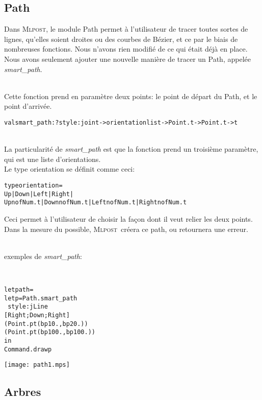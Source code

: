 \documentclass[a4paper,12pt]{article}
\newcommand{\mlpost}{\textsc{Mlpost}}
\begin{document}
\subsection{Path}
Dans \mlpost, le module Path permet à l'utilisateur de tracer toutes sortes de lignes, qu'elles soient droites ou des courbes de Bézier, et ce par le biais de nombreuses fonctions.
Nous n'avons rien modifié de ce qui était déjà en place. Nous avons seulement ajouter une nouvelle manière de tracer un Path, appelée \textit{smart\_path}. 

~\\Cette fonction prend en paramètre deux points: le point de départ du Path, et le point d'arrivée. 
\begin{alltt}
  val smart_path : ?style:joint -> orientation list -> Point.t -> Point.t -> t
\end{alltt}
~\\La particularité de \textit{smart\_path} est que la fonction prend un troisième paramètre, qui est une liste d'orientations.
~\\Le type orientation se définit comme ceci:
\begin{alltt}
  type orientation =
  Up | Down | Left | Right |
  Upn of Num.t | Downn of Num.t | Leftn of Num.t | Rightn of Num.t
\end{alltt}
Ceci permet à l'utilisateur de choisir la façon dont il veut relier les deux points. Dans la mesure du possible, \mlpost\ créera ce path, ou retournera une erreur. 

~\\exemples de \textit{smart\_path}:

~\\
\begin{minipage}{0.5\linewidth}
  \begin{alltt}
    let path = 
    let p = Path.smart_path 
    ~style:jLine
    [Right;Down;Right]
    (Point.pt (bp 10.,bp 20.)) 
    (Point.pt (bp 100.,bp 100.))
    in
    Command.draw p
  \end{alltt}
\end{minipage}
\begin{minipage}{0.5\linewidth}
\begin{center}
\texttt{[image: path1.mps]}
\end{center}
\end{minipage}

\subsection{Arbres}
\end{document}
